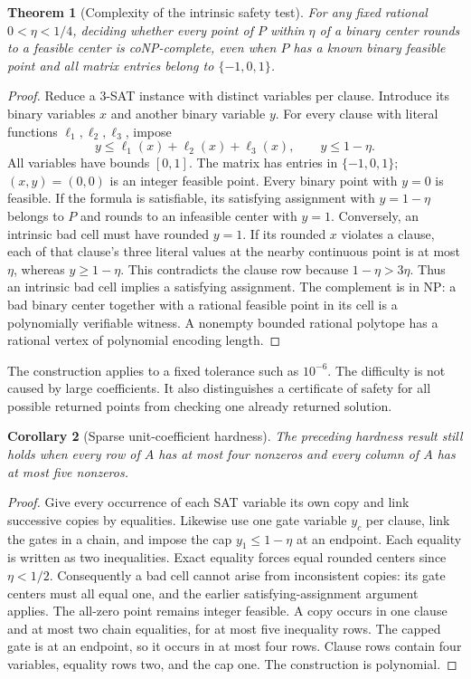 \documentclass[11pt]{article}
\newtheorem{theorem}{Theorem}
\newtheorem{corollary}[theorem]{Corollary}
\begin{document}
\begin{theorem}[Complexity of the intrinsic safety test]
For any fixed rational $0<\eta<1/4$, deciding whether every point of $P$ within
$\eta$ of a binary center rounds to a feasible center is coNP-complete, even when
$P$ has a known binary feasible point and all matrix entries belong to $\{-1,0,1\}$.
\end{theorem}
\begin{proof}
Reduce a 3-SAT instance with distinct variables per clause. Introduce its binary
variables $x$ and another binary variable $y$. For every clause with literal
functions $\ell_1,\ell_2,\ell_3$, impose
\[
 y\le\ell_1(x)+\ell_2(x)+\ell_3(x),\qquad y\le1-\eta.
\]
All variables have bounds $[0,1]$. The matrix has entries in $\{-1,0,1\}$;
$(x,y)=(0,0)$ is an integer feasible point. Every binary point with $y=0$ is feasible.
If the formula is satisfiable, its satisfying assignment with $y=1-\eta$ belongs
to $P$ and rounds to an infeasible center with $y=1$.
Conversely, an intrinsic bad cell must have rounded $y=1$. If its rounded $x$
violates a clause, each of that clause's three literal values at the nearby continuous
point is at most $\eta$, whereas $y\ge1-\eta$. This contradicts the clause row
because $1-\eta>3\eta$. Thus an intrinsic bad cell implies a satisfying assignment.
The complement is in NP: a bad binary center together with a rational feasible
point in its cell is a polynomially verifiable witness. A nonempty bounded rational
polytope has a rational vertex of polynomial encoding length.
\end{proof}
The construction applies to a fixed tolerance such as $10^{-6}$. The difficulty is
not caused by large coefficients. It also distinguishes a certificate of safety for
all possible returned points from checking one already returned solution.

\begin{corollary}[Sparse unit-coefficient hardness]
The preceding hardness result still holds when every row of $A$ has at most four
nonzeros and every column of $A$ has at most five nonzeros.
\end{corollary}
\begin{proof}
Give every occurrence of each SAT variable its own copy and link successive copies
by equalities. Likewise use one gate variable $y_c$ per clause, link the gates in
a chain, and impose the cap $y_1\le1-\eta$ at an endpoint. Each equality is written
as two inequalities. Exact equality forces equal rounded centers since $\eta<1/2$.
Consequently a bad cell cannot arise from inconsistent copies: its gate centers
must all equal one, and the earlier satisfying-assignment argument applies.
The all-zero point remains integer feasible. A copy occurs in one clause and at
most two chain equalities, for at most five inequality rows. The capped gate is
at an endpoint, so it occurs in at most four rows. Clause rows contain four
variables, equality rows two, and the cap one. The construction is polynomial.
\end{proof}
\end{document}
